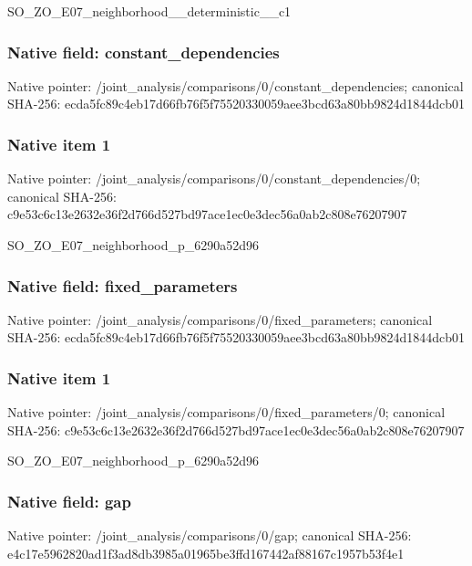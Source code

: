 \documentclass[10pt,a4paper]{article}
\begin{document}
\begingroup\raggedright\sloppy SO\_\allowbreak{}ZO\_\allowbreak{}E07\_\allowbreak{}neighborhood\_\allowbreak{}\_\allowbreak{}deterministic\_\allowbreak{}\_\allowbreak{}c1\par\endgroup

\subsubsection{Native field: constant\_\allowbreak{}dependencies}
Native pointer: /joint\_\allowbreak{}analysis/comparisons/0/constant\_\allowbreak{}dependencies; canonical SHA-256: ecda5fc89c4eb17d66fb76f5f75520330059aee3bcd63a80bb9824d1844dcb01

\subsubsection{Native item 1}
Native pointer: /joint\_\allowbreak{}analysis/comparisons/0/constant\_\allowbreak{}dependencies/0; canonical SHA-256: c9e53c6c13e2632e36f2d766d527bd97ace1ec0e3dec56a0ab2c808e76207907

\begingroup\raggedright\sloppy SO\_\allowbreak{}ZO\_\allowbreak{}E07\_\allowbreak{}neighborhood\_\allowbreak{}p\_\allowbreak{}6290a52d96\par\endgroup

\subsubsection{Native field: fixed\_\allowbreak{}parameters}
Native pointer: /joint\_\allowbreak{}analysis/comparisons/0/fixed\_\allowbreak{}parameters; canonical SHA-256: ecda5fc89c4eb17d66fb76f5f75520330059aee3bcd63a80bb9824d1844dcb01

\subsubsection{Native item 1}
Native pointer: /joint\_\allowbreak{}analysis/comparisons/0/fixed\_\allowbreak{}parameters/0; canonical SHA-256: c9e53c6c13e2632e36f2d766d527bd97ace1ec0e3dec56a0ab2c808e76207907

\begingroup\raggedright\sloppy SO\_\allowbreak{}ZO\_\allowbreak{}E07\_\allowbreak{}neighborhood\_\allowbreak{}p\_\allowbreak{}6290a52d96\par\endgroup

\subsubsection{Native field: gap}
Native pointer: /joint\_\allowbreak{}analysis/comparisons/0/gap; canonical SHA-256: e4c17e5962820ad1f3ad8db3985a01965be3ffd167442af88167c1957b53f4e1
\end{document}
